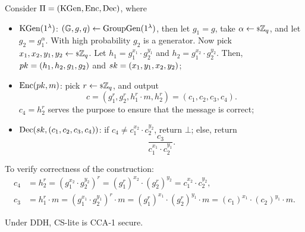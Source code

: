 \begin{construction}
	Consider $\Pi = (\mathrm{KGen}, \mathrm{Enc}, \mathrm{Dec})$, where
	\begin{itemize}
		\item $\mathrm{KGen}(1^{\lambda})$:
			$(\mathbb{G} , \allowbreak g , \allowbreak q) \leftarrow \mathrm{GroupGen}(1^{\lambda})$, then let $g_1 = g$, take $\alpha \leftarrow {\scriptstyle \$} {\mathbb{Z}_q}$, and let $g_2 = g_1^{\alpha}$.
			With high probability $g_2$ is a generator.
			Now pick $x_1, x_2, y_1, y_2 \leftarrow {\scriptstyle \$} {\mathbb{Z}_q}$.
			Let $h_1 = g_1^{x_1} \cdot g_2^{y_1}$ and $h_2 = g_1^{x_2} \cdot g_2^{y_2}$.
			Then, $pk = (h_1, h_2, g_1, g_2)$ and $sk = (x_1, y_1, x_2, y_2)$;
		\item $\mathrm{Enc}(pk, m)$:
			pick $r \leftarrow {\scriptstyle \$} {\mathbb{Z}_q}$, and output
			\begin{equation*}
				c = (g_1^r, g_2^r, h_1^r \cdot m, h_2^r) = (c_1, c_2, c_3, c_4).
			\end{equation*}
			$c_4 = h_2^r$ serves the purpose to ensure that the message is correct;
		\item $\mathrm{Dec}(sk, (c_1, c_2, c_3, c_4))$:
			if $c_4 \neq c_1^{x_2} \cdot c_2^{y_2}$, return $\bot$;
			else, return
			\begin{equation*}
				\frac{c_3}{c_1^{x_1} \cdot c_2^{y_1}}.
			\end{equation*}
	\end{itemize}
	To verify correctness of the construction:
	\begin{align*}
		c_4 & =
		h_2^r =
		{(g_1^{x_2} \cdot g_2^{y_2})}^r =
		{(g_1^r)}^{x_2} \cdot {(g_2^r)}^{y_2} =
		c_1^{x_2} \cdot c_2^{y_2}, \\
		c_3 & =
		h_1^r \cdot m =
		(g_1^{x_1} \cdot g_2^{y_1})^{r} \cdot m =
		(g_1^r)^{x_1} \cdot (g_2^r)^{y_1} \cdot m =
		(c_1)^{x_1} \cdot (c_2)^{y_1} \cdot m.
	\end{align*}
\end{construction}

\begin{theorem} \label{thm:cs-lite-cca-1}
	Under \ac{DDH}, \ac{CS}-lite is \ac{CCA}-1 secure.
\end{theorem}

